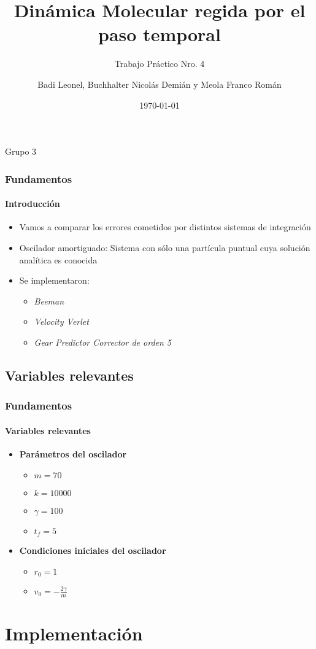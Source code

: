 \documentclass[hyperref={pdfpagelayout=SinglePage}]{beamer}
\title{Dinámica Molecular regida por el paso temporal}
\subtitle{Trabajo Práctico Nro. 4}
\author{Badi Leonel, Buchhalter Nicolás Demián y Meola Franco Román}
\date{\today}
\begin{document}
\begin{frame}
    \frametitle{} 
    \titlepage
    \centering
	Grupo 3
\end{frame}

\begin{frame}
\frametitle{Fundamentos}
\framesubtitle{Introducción}
\begin{itemize}
	\item Vamos a comparar los errores cometidos por distintos sistemas de integración
	\item Oscilador amortiguado: Sistema con sólo una partícula puntual cuya solución analítica es conocida
	\item Se implementaron:
	\begin{itemize}
		\item \textit{Beeman}
		\item \textit{Velocity Verlet}
		\item \textit{Gear Predictor Corrector de orden 5}
	\end{itemize}
\end{itemize}
\end{frame}

\subsection{Variables relevantes}

\begin{frame}
\frametitle{Fundamentos}
\framesubtitle{Variables relevantes}
\begin{itemize}
\item \textbf{Parámetros del oscilador}
	\begin{itemize}
		\item $m = 70$
		\item $k = 10000$
		\item $\gamma = 100$
		\item $t_{f} = 5$ 
	\end{itemize}
\item \textbf{Condiciones iniciales del oscilador}
	\begin{itemize}
		\item $r_{0} = 1$
		\item $v_{0} = -\frac{2\gamma}{m}$
	\end{itemize}
\end{itemize}
\end{frame}

\section{Implementación}
\end{document}
